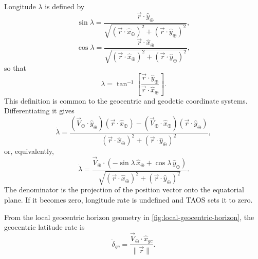 Longitude $\lambda$ is defined by
\begin{equation}
  \sin\lambda
  =\frac{\vec r\mathbin{\cdot}\hat y_{\oplus}}
  {\sqrt{
    \left(\vec r\mathbin{\cdot}\hat x_{\oplus}\right)^2
    +\left(\vec r\mathbin{\cdot}\hat y_{\oplus}\right)^2
  }},
  \label{eq:longitude-sine}
\end{equation}
\begin{equation}
  \cos\lambda
  =\frac{\vec r\mathbin{\cdot}\hat x_{\oplus}}
  {\sqrt{
    \left(\vec r\mathbin{\cdot}\hat x_{\oplus}\right)^2
    +\left(\vec r\mathbin{\cdot}\hat y_{\oplus}\right)^2
  }},
  \label{eq:longitude-cosine}
\end{equation}
so that
\begin{equation}
  \lambda
  =\tan^{-1}
    \left[
      \frac{\vec r\mathbin{\cdot}\hat y_{\oplus}}
           {\vec r\mathbin{\cdot}\hat x_{\oplus}}
    \right].
  \label{eq:longitude-arctangent}
\end{equation}
This definition is common to the geocentric and geodetic coordinate systems.
Differentiating it gives
\begin{equation}
  \dot\lambda
  =\frac{
    \left(\vec V_{\oplus}\mathbin{\cdot}\hat y_{\oplus}\right)
    \left(\vec r\mathbin{\cdot}\hat x_{\oplus}\right)
    -
    \left(\vec V_{\oplus}\mathbin{\cdot}\hat x_{\oplus}\right)
    \left(\vec r\mathbin{\cdot}\hat y_{\oplus}\right)
  }{
    \left(\vec r\mathbin{\cdot}\hat x_{\oplus}\right)^2
    +\left(\vec r\mathbin{\cdot}\hat y_{\oplus}\right)^2
  },
  \label{eq:longitude-rate-component-form}
\end{equation}
or, equivalently,
\begin{equation}
  \dot\lambda
  =\frac{
    \vec V_{\oplus}\mathbin{\cdot}
    \left(-\sin\lambda\,\hat x_{\oplus}
          +\cos\lambda\,\hat y_{\oplus}\right)
  }{
    \sqrt{
      \left(\vec r\mathbin{\cdot}\hat x_{\oplus}\right)^2
      +\left(\vec r\mathbin{\cdot}\hat y_{\oplus}\right)^2
    }
  }.
  \label{eq:longitude-rate-unit-vector-form}
\end{equation}
The denominator is the projection of the position vector onto the equatorial plane.
If it becomes zero, longitude rate is undefined and TAOS sets it to zero.


From the local geocentric horizon geometry in
\cref{fig:local-geocentric-horizon}, the geocentric latitude rate is
\begin{equation}
  \dot\delta_{gc}
  =\frac{\vec V_{\oplus}\mathbin{\cdot}\hat x_{gc}}
         {\lVert\vec r\rVert}.
  \label{eq:geocentric-latitude-rate}
\end{equation}

